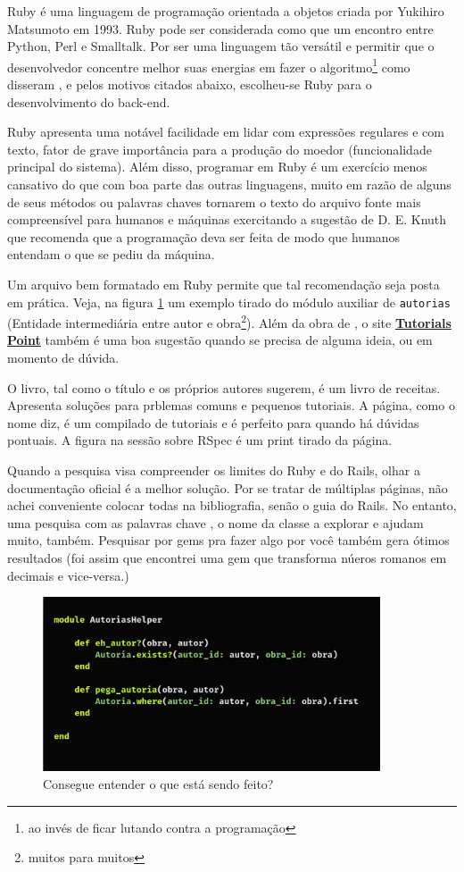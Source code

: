 Ruby é uma linguagem de programação orientada a objetos criada por Yukihiro
Matsumoto em 1993. Ruby pode ser considerada como que um encontro entre Python,
Perl e Smalltalk. Por ser uma linguagem tão versátil e permitir que o
desenvolvedor concentre melhor suas energias em fazer o algoritmo\footnote{ao
invés de ficar lutando contra a programação}  como disseram \citet{Rcook:09}, e
pelos motivos citados abaixo, escolheu-se Ruby para o desenvolvimento do back-end.

Ruby apresenta uma notável facilidade em lidar com expressões regulares
e com texto, fator de grave importância para a produção do moedor (funcionalidade
principal do sistema). Além disso, programar em Ruby é um exercício menos cansativo
do que com boa parte das outras linguagens, muito em razão de alguns de seus métodos
ou palavras chaves tornarem o texto do arquivo fonte mais compreensível para
humanos e máquinas exercitando a sugestão de D. E. Knuth que recomenda que a
programação deva ser feita de modo que humanos entendam o que se pediu da máquina.

Um arquivo bem formatado em Ruby permite que tal recomendação seja posta em
prática. Veja, na figura \ref{fig:ruby} um exemplo tirado do módulo auxiliar de
\texttt{autorias} (Entidade intermediária entre autor e obra\footnote{muitos para
muitos}). Além da obra de \citet{Rcook:09}, o site
\href{https://www.tutorialspoint.com/ruby/index.htm}{\textbf{Tutorials Point}}
também é uma boa sugestão quando se precisa de alguma ideia, ou em momento de dúvida.

O livro, tal como o título e os próprios autores \cite[xvii]{Rcook:09} sugerem, é um
livro de receitas. Apresenta soluções para prblemas comuns e pequenos tutoriais. A
página, como o nome diz, é um compilado de tutoriais e é perfeito para quando há
dúvidas pontuais. A figura na sessão sobre RSpec é um print tirado da página.

Quando a pesquisa visa compreender os limites do Ruby e do Rails, olhar a documentação
oficial é a melhor solução. Por se tratar de múltiplas páginas, não achei conveniente
colocar todas na bibliografia, senão o guia do Rails. No entanto, uma pesquisa com as
palavras chave , o nome da classe a explorar e  ajudam muito, também.
Pesquisar por gems pra fazer algo por você também gera ótimos resultados (foi assim que
encontrei uma gem que transforma núeros romanos em decimais e vice-versa.)

\begin{figure}
    \centering
    \includegraphics[width=10cm]{figuras/ruby}
    \caption{Consegue entender o que está sendo feito?}
    \label{fig:ruby}
\end{figure}


